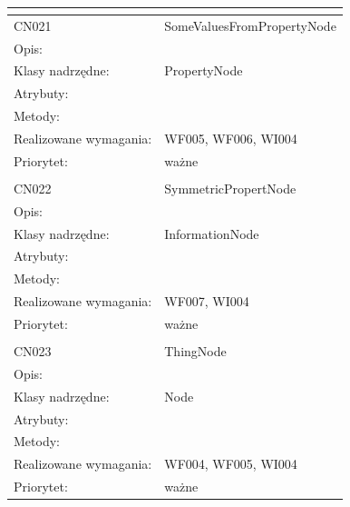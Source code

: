 \documentclass[a4paper,10pt]{article}
\begin{document}
\begin{center}
\begin{longtable}{|m{3cm}|m{9cm}|}
\multicolumn{2}{c}{} \\
 \hline

CN021 & SomeValuesFromPropertyNode \\ \hline
Opis: &     \\ \hline
Klasy nadrzędne: & PropertyNode     \\ \hline
Atrybuty: & %
 \\ \hline
Metody: & %
  \\ \hline
Realizowane wymagania: & WF005, WF006, WI004 \\ \hline
Priorytet: & ważne  \\ \hline

\multicolumn{2}{c}{} \\
 \hline

CN022 & SymmetricPropertNode \\ \hline
Opis: &     \\ \hline
Klasy nadrzędne: & InformationNode     \\ \hline
Atrybuty: & %
 \\ \hline
Metody: & %
  \\ \hline
Realizowane wymagania: & WF007, WI004 \\ \hline
Priorytet: & ważne  \\ \hline

\multicolumn{2}{c}{} \\
 \hline

CN023 & ThingNode \\ \hline
Opis: &     \\ \hline
Klasy nadrzędne: & Node     \\ \hline
Atrybuty: & %
 \\ \hline
Metody: & %
  \\ \hline
Realizowane wymagania: & WF004, WF005, WI004 \\ \hline
Priorytet: & ważne  \\ \hline


\end{longtable}
\end{center}
\end{document}
